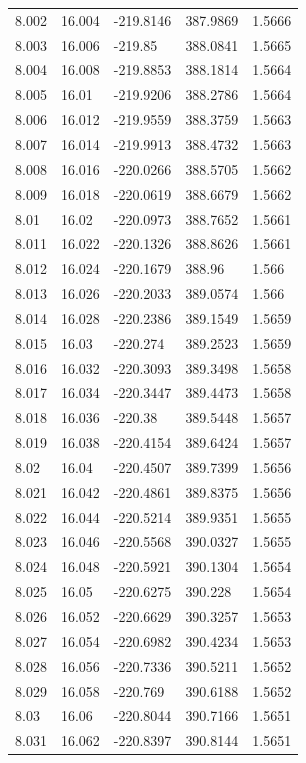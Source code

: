 \begin{tabular}{lllll}
8.002 & 16.004 & -219.8146 & 387.9869 & 1.5666 \\
8.003 & 16.006 & -219.85 & 388.0841 & 1.5665 \\
8.004 & 16.008 & -219.8853 & 388.1814 & 1.5664 \\
8.005 & 16.01 & -219.9206 & 388.2786 & 1.5664 \\
8.006 & 16.012 & -219.9559 & 388.3759 & 1.5663 \\
8.007 & 16.014 & -219.9913 & 388.4732 & 1.5663 \\
8.008 & 16.016 & -220.0266 & 388.5705 & 1.5662 \\
8.009 & 16.018 & -220.0619 & 388.6679 & 1.5662 \\
8.01 & 16.02 & -220.0973 & 388.7652 & 1.5661 \\
8.011 & 16.022 & -220.1326 & 388.8626 & 1.5661 \\
8.012 & 16.024 & -220.1679 & 388.96 & 1.566 \\
8.013 & 16.026 & -220.2033 & 389.0574 & 1.566 \\
8.014 & 16.028 & -220.2386 & 389.1549 & 1.5659 \\
8.015 & 16.03 & -220.274 & 389.2523 & 1.5659 \\
8.016 & 16.032 & -220.3093 & 389.3498 & 1.5658 \\
8.017 & 16.034 & -220.3447 & 389.4473 & 1.5658 \\
8.018 & 16.036 & -220.38 & 389.5448 & 1.5657 \\
8.019 & 16.038 & -220.4154 & 389.6424 & 1.5657 \\
8.02 & 16.04 & -220.4507 & 389.7399 & 1.5656 \\
8.021 & 16.042 & -220.4861 & 389.8375 & 1.5656 \\
8.022 & 16.044 & -220.5214 & 389.9351 & 1.5655 \\
8.023 & 16.046 & -220.5568 & 390.0327 & 1.5655 \\
8.024 & 16.048 & -220.5921 & 390.1304 & 1.5654 \\
8.025 & 16.05 & -220.6275 & 390.228 & 1.5654 \\
8.026 & 16.052 & -220.6629 & 390.3257 & 1.5653 \\
8.027 & 16.054 & -220.6982 & 390.4234 & 1.5653 \\
8.028 & 16.056 & -220.7336 & 390.5211 & 1.5652 \\
8.029 & 16.058 & -220.769 & 390.6188 & 1.5652 \\
8.03 & 16.06 & -220.8044 & 390.7166 & 1.5651 \\
8.031 & 16.062 & -220.8397 & 390.8144 & 1.5651 \\

\end{tabular}
